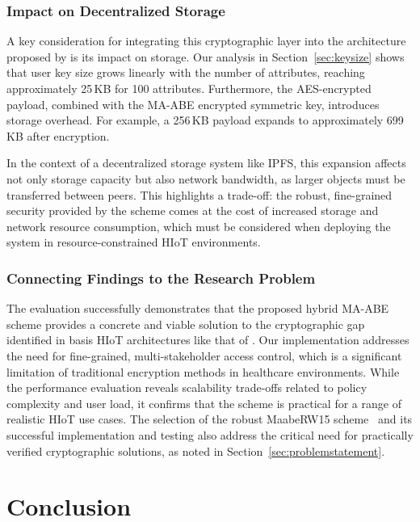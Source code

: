 \documentclass[cic,tc,english]{iiufrgs}
\numberwithin{algorithm}{chapter}
\begin{document}
            \subsection{Impact on Decentralized Storage}

                A key consideration for integrating this cryptographic layer into the architecture proposed by \citet{laura2023} is its impact on storage. Our analysis in Section~\ref{sec:keysize} shows that user key size grows linearly with the number of attributes, reaching approximately 25\,KB for 100 attributes. Furthermore, the AES-encrypted payload, combined with the MA-ABE encrypted symmetric key, introduces storage overhead. For example, a 256\,KB payload expands to approximately 699\,KB after encryption.

                In the context of a decentralized storage system like IPFS, this expansion affects not only storage capacity but also network bandwidth, as larger objects must be transferred between peers. This highlights a trade-off: the robust, fine-grained security provided by the scheme comes at the cost of increased storage and network resource consumption, which must be considered when deploying the system in resource-constrained HIoT environments.

            \subsection{Connecting Findings to the Research Problem}

                The evaluation successfully demonstrates that the proposed hybrid MA-ABE scheme provides a concrete and viable solution to the cryptographic gap identified in basis HIoT architectures like that of \citet{laura2023}. Our implementation addresses the need for fine-grained, multi-stakeholder access control, which is a significant limitation of traditional encryption methods in healthcare environments. While the performance evaluation reveals scalability trade-offs related to policy complexity and user load, it confirms that the scheme is practical for a range of realistic HIoT use cases. The selection of the robust MaabeRW15 scheme~\citep{rouselakis2015efficient} and its successful implementation and testing also address the critical need for practically verified cryptographic solutions, as noted in Section~\ref{sec:problemstatement}.


\chapter{Conclusion}
    \label{chap:conclusion}
\end{document}
